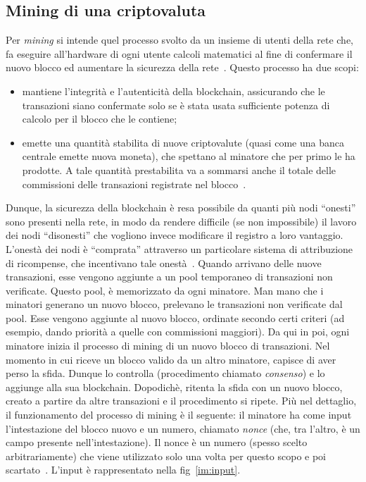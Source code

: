 \subsection{Mining di una criptovaluta}
Per \textit{mining} si intende quel processo svolto da un insieme di utenti della rete che, fa eseguire all'hardware di ogni utente calcoli matematici al fine di confermare il nuovo blocco ed aumentare la sicurezza della rete~\cite{sito:bitcoin}.
Questo processo ha due scopi:
\begin{itemize}
\item mantiene l’integrità e l’autenticità della blockchain, assicurando che le transazioni siano confermate solo se \`e stata usata sufficiente potenza di calcolo per il blocco che le contiene;
\item emette una quantità stabilita di nuove criptovalute (quasi come una banca centrale emette nuova moneta), che spettano al minatore che per primo le ha prodotte. A tale quantità prestabilita va a sommarsi anche il totale delle commissioni delle transazioni registrate nel blocco~\cite{art:bc2}.
\end{itemize} 
Dunque, la sicurezza della blockchain \`e resa possibile da quanti più nodi “onesti” sono presenti nella rete, in modo da rendere difficile (se non impossibile) il lavoro dei nodi “disonesti” che vogliono invece modificare il registro a loro vantaggio. 
L’onestà dei nodi \`e ``comprata” attraverso un particolare sistema di attribuzione di ricompense, che incentivano tale onestà~\cite{tesi:venezia}.
Quando arrivano delle nuove transazioni, esse vengono aggiunte a un pool temporaneo di transazioni non verificate. Questo pool, \`e memorizzato da ogni minatore. Man mano che i minatori generano un nuovo blocco, prelevano le transazioni non verificate dal pool. Esse vengono aggiunte al nuovo blocco, ordinate secondo certi criteri (ad esempio, dando priorità a quelle con commissioni maggiori). Da qui in poi, ogni minatore inizia il processo di mining di un nuovo blocco di transazioni. Nel momento in cui riceve un blocco valido da un altro minatore, capisce di aver perso la sfida. Dunque lo controlla (procedimento chiamato \textit{consenso}) e lo aggiunge alla sua blockchain. Dopodich\`e, ritenta la sfida con un nuovo blocco, creato a partire da altre transazioni e il procedimento si ripete.
Più nel dettaglio, il funzionamento del processo di mining \`e il seguente: il minatore ha come input l'intestazione del blocco nuovo e un numero, chiamato \textit{nonce} (che, tra l'altro, \`e un campo presente nell'intestazione). Il nonce \`e un numero (spesso scelto arbitrariamente) che viene utilizzato solo una volta per questo scopo e poi scartato~\cite{art:bc1}. L'input \`e rappresentato nella fig~\ref{im:input}.
